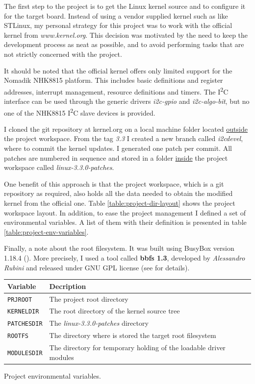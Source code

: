 \documentclass[a4paper,10pt]{article}
\makeatletter
\newenvironment{tablehere}{\def\@captype{table}}{}
\newcommand{\iic}{I\textsuperscript{2}C }
\makeatother
\begin{document}
\begin{multicols}{2}
The first step to the project is to get the Linux kernel source and to configure
it for the target board. Instead of  using a vendor supplied kernel such as like
STLinux, my personal strategy for this project was to work with the official
kernel from \emph{www.kernel.org}.
This decision was motivated by the need to keep the development process as neat
as possible, and to avoid performing tasks that are not strictly concerned with
the project.

It should be noted that the official kernel offers only limited support for the
Nomadik  NHK8815 platform.
This includes basic definitions and register addresses, interrupt management,
resource definitions and timers. The \iic interface can be used through the
generic drivers \emph{i2c-gpio} and \emph{i2c-algo-bit}, but no one of the
NHK8815 \iic slave devices is provided.

I cloned the git repository at kernel.org on a local machine folder
located \underline{outside} the project workspace. From the tag \emph{3.3}
I created a new branch called \emph{i2cdevel}, where to commit the kernel updates.
I generated one patch per commit. All patches are numbered in sequence and
stored in a folder \underline{inside} the project workspace called
\emph{linux-3.3.0-patches}.

One benefit of this approach is that the project workspace, which is a git
repository as required, also holds all the data needed to obtain the modified
kernel from the official one.
Table \ref{table:project-dir-layout} shows the project workspace layout.
In addition, to ease the project management I defined a set of environmental
variables. A list of them with their definition is presented in table
\ref{table:project-env-variables}.

Finally, a note about the root filesystem. It was built using BusyBox
version 1.18.4 (\cite{busybox}). More precisely, I used a tool called
\textbf{bbfs 1.3}, developed by \emph{Alessandro Rubini} and released under
GNU GPL license (see \cite{bbfs1.3} for details).\\

\begin{tablehere}
	\centering
	\renewcommand{\arraystretch}{1.2}	
	\begin{tabular}{l p{5.5cm}}
		\hline
		Variable & Decription \\
		\hline
		\texttt{PRJROOT} & The project root directory\\
		\texttt{KERNELDIR} & The root directory of the kernel source tree \\
		\texttt{PATCHESDIR} & The \emph{linux-3.3.0-patches} directory \\
		\texttt{ROOTFS} & The directory where is stored the target root
			filesystem \\
		\texttt{MODULESDIR} & The directory for temporary holding of the
			loadable driver modules \\
		\hline
	\end{tabular}
	\caption{Project environmental variables.}
	\label{table:project-env-variables}
\end{tablehere}



\end{multicols}
\end{document}

